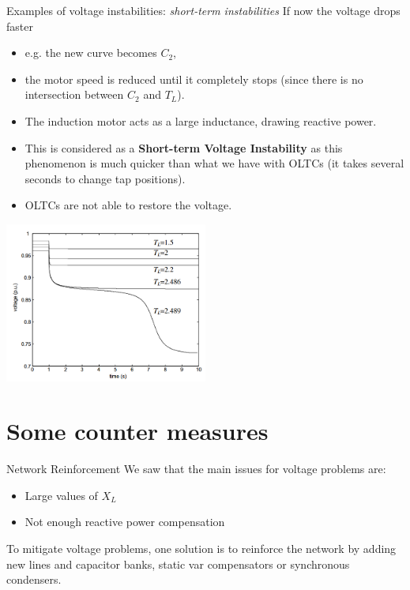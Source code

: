 \begin{frame}[allowframebreaks]{Examples of voltage instabilities: \textit{short-term instabilities}}
If now the voltage drops faster
\begin{itemize}
    \item e.g. the new curve becomes $C_2$, 
    \item the motor speed is reduced until it completely stops (since there is no intersection between $C_2$ and $T_L$).
    \item The induction motor acts as a large inductance, drawing reactive power.
    \item This is considered as a \textbf{Short-term Voltage Instability} as this phenomenon is much quicker than what we have with OLTCs (it takes several seconds to change tap positions).
    \item OLTCs are not able to restore the voltage.
\end{itemize}

\begin{center}
\includegraphics[width=0.5\textwidth]{images/InductionMotorVoltage.png}
\end{center}
\end{frame}

\section{Some counter measures}

\begin{frame}{Network Reinforcement}
We saw that the main issues for voltage problems are:
\begin{itemize}
    \item Large values of $X_L$
    \item Not enough reactive power compensation
\end{itemize}
To mitigate voltage problems, one solution is to reinforce the network by adding new lines and capacitor banks, static var compensators or synchronous condensers.
\end{frame}


